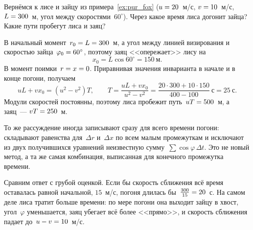 \documentclass[../main.tex]{subfiles}
\begin{document}
\begin{example}
Вернёмся к лисе и зайцу из примера~\ref{ex:pur_fox} ($u \hm= 20$~м/с, $v \hm= 10$~м/с, $L \hm= 300$~м,
угол между скоростями~$60^\circ$). Через какое время лиса догонит зайца? Какие пути
пробегут лиса и заяц?\label{ex:pur_fox2}

В начальный момент~$r_0 \hm= L \hm= 300$~м, а угол между линией визирования и скоростью
зайца~$\varphi_0 \hm= 60^\circ$, поэтому заяц <<опережает>> лису на
\[
x_0 = L\cos 60^\circ = 150~\text{м}.
\]
В момент поимки~$r \hm= x \hm= 0$. Приравнивая значения инварианта в начале и в конце
погони, получаем
\[
uL + vx_0 = (u^2 - v^2)T,
\qquad
T = \frac{uL + vx_0}{u^2 - v^2} = \frac{20\cdot 300 + 10\cdot 150}{400 - 100}~\text{с} = 25~\text{с}.
\]
Модули скоростей постоянны, поэтому лиса пробежит путь~$uT \hm= 500$~м, а заяц~---
$vT \hm= 250$~м.

То же рассуждение иногда записывают сразу для всего времени погони: складывают
равенства для~$\Delta r$ и~$\Delta x$ по всем малым промежуткам и исключают из двух
получившихся уравнений неизвестную сумму~$\sum\cos\varphi\,\Delta t$. Это не новый
метод, а та же самая комбинация, выписанная для конечного промежутка времени.

Сравним ответ с грубой оценкой. Если бы скорость сближения всё время оставалась
равной начальной, $15$~м/с, погоня длилась бы~$\frac{300}{15} \hm= 20$~с. На самом деле лиса
тратит больше времени: по мере погони она выходит зайцу в хвост, угол~$\varphi$
уменьшается, заяц убегает всё более <<прямо>>, и скорость сближения падает до~$u - v \hm= 10$~м/с.
\end{example}
\end{document}
